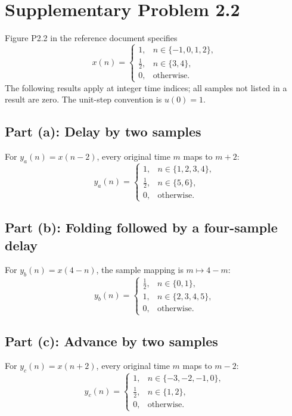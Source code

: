 \section{Supplementary Problem 2.2}
Figure P2.2 in the reference document specifies
\begin{equation}
  x(n)=\begin{cases}
    1, & n\in\{-1,0,1,2\},\\
    \tfrac12, & n\in\{3,4\},\\
    0, & \text{otherwise}.
  \end{cases}
\end{equation}
The following results apply at integer time indices; all samples not
listed in a result are zero. The unit-step convention is $u(0)=1$.

\subsection{Part (a): Delay by two samples}
For $y_a(n)=x(n-2)$, every original time $m$ maps to $m+2$:
\begin{equation}
  y_a(n)=\begin{cases}
    1, & n\in\{1,2,3,4\},\\
    \tfrac12, & n\in\{5,6\},\\
    0, & \text{otherwise}.
  \end{cases}
\end{equation}

\subsection{Part (b): Folding followed by a four-sample delay}
For $y_b(n)=x(4-n)$, the sample mapping is $m\mapsto4-m$:
\begin{equation}
  y_b(n)=\begin{cases}
    \tfrac12, & n\in\{0,1\},\\
    1, & n\in\{2,3,4,5\},\\
    0, & \text{otherwise}.
  \end{cases}
\end{equation}

\subsection{Part (c): Advance by two samples}
For $y_c(n)=x(n+2)$, every original time $m$ maps to $m-2$:
\begin{equation}
  y_c(n)=\begin{cases}
    1, & n\in\{-3,-2,-1,0\},\\
    \tfrac12, & n\in\{1,2\},\\
    0, & \text{otherwise}.
  \end{cases}
\end{equation}

